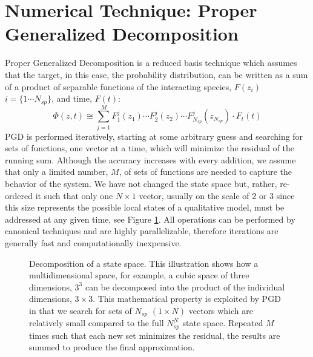 \documentclass[en]{jdoc}
\begin{document}
\section{Numerical Technique: Proper Generalized Decomposition}
Proper Generalized Decomposition is a reduced basis technique which assumes that the target, in this case, the probability distribution, can be written as a sum of a product of separable functions of the interacting species, $F(z_i)$ $i=\{1\cdots N_{sp}\}$, and time, $F(t)$:
\[
 \Phi(z,t)\cong \sum_{j=1}^{M}F_1^j(z_1)\cdots F_2^j(z_2)\cdots F_{N_{sp}}^j(z_{N_{sp}}) \cdot F_t(t)
\]
PGD is performed iteratively, starting at some arbitrary guess and searching for sets of functions, one vector at a time, which will minimize the residual of the running sum. Although the accuracy increases with every addition, we assume that only a limited number, $M$, of sets of functions are needed to capture the behavior of the system. We have not changed the state space but, rather, re-ordered it such that only one $N\times1$ vector, usually on the scale of 2 or 3 since this size represents the possible local states of a qualitative model, must be addressed at any given time, see Figure \ref{cubes}. All operations can be performed by canonical techniques and are highly parallelizable, therefore iterations are generally fast and computationally inexpensive.
\begin{figure}[h]
\centering
{}
\caption{Decomposition of a state space. This illustration shows how a multidimensional space, for example, a cubic space of three dimensions, $3^3$ can be decomposed into the product of the individual dimensions, $3\times 3$. This mathematical property is exploited by PGD in that we search for sets of $N_{sp}$ $(1\times N)$ vectors  which are relatively small compared to the full $N_{sp}^N$ state space. Repeated $M$ times such that each new set minimizes the residual, the results are summed to produce the final approximation.}
\label{cubes}
\end{figure}
\end{document}
